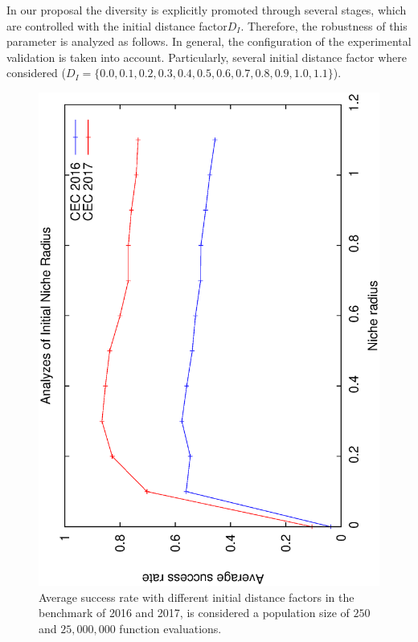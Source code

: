 In our proposal the diversity is explicitly promoted through several stages, which are controlled with the initial distance factor$D_I$.
%
Therefore, the robustness of this parameter is analyzed as follows.
%
In general, the configuration of the experimental validation is taken into account.
%
Particularly, several initial distance factor where considered ($D_I = \{0.0, 0.1, 0.2, 0.3, 0.4, 0.5, 0.6, 0.7, 0.8, 0.9, 1.0, 1.1 \}$).
%
\begin{figure}[t]
\centering
  \includegraphics[scale=0.3, angle=-90]{img/Tuning_CEC.eps}
\caption{Average success rate with different initial distance factors in the benchmark of \CEC{} 2016 and \CEC{} 2017, is considered a population size of $250$ and $25,000,000$ function evaluations.}
\label{fig:one}
\end{figure}

